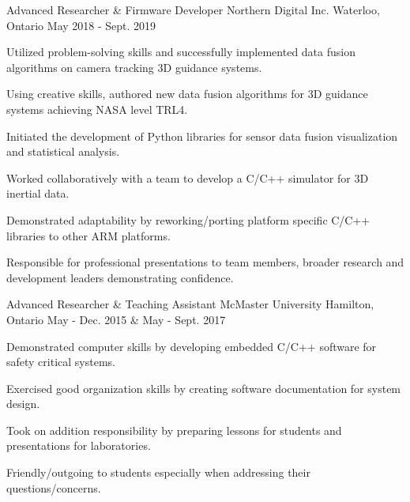 
\begin{cventries}

  \cventry
    {Advanced Researcher \& Firmware Developer} %
    {Northern Digital Inc.} %
    {Waterloo, Ontario} %
    {May 2018 - Sept. 2019} %
    {
      \begin{cvitems} %
        \item {Utilized problem-solving skills and successfully implemented data fusion algorithms on camera tracking 3D guidance systems.}
        \item {Using creative skills, authored new data fusion algorithms for 3D guidance systems achieving NASA level TRL4.}
        \item {Initiated the development of Python libraries for sensor data fusion visualization and statistical analysis.}
        \item {Worked collaboratively with a team to develop a C/C++ simulator for 3D inertial data.}
        \item {Demonstrated adaptability by reworking/porting platform specific C/C++ libraries to other ARM platforms.}
        \item {Responsible for professional presentations to team members, broader research and development leaders demonstrating confidence.}
      \end{cvitems}
    }

  \cventry
    {Advanced Researcher \& Teaching Assistant} %
    {McMaster University} %
    {Hamilton, Ontario} %
    {May - Dec. 2015 \& May - Sept. 2017} %
    {
      \begin{cvitems} %
        \item {Demonstrated computer skills by developing embedded C/C++ software for safety critical systems.}
        \item {Exercised good organization skills by creating software documentation for system design.}
        \item {Took on addition responsibility by preparing lessons for students and presentations for laboratories.}
        \item {Friendly/outgoing to students especially when addressing their questions/concerns.}
      \end{cvitems}
    }


\end{cventries}
